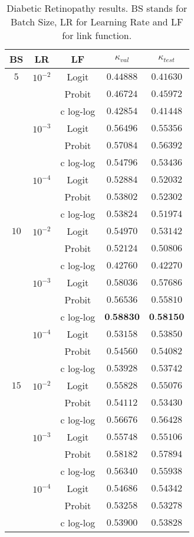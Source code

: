 \documentclass[journal]{IEEEtran}
\begin{document}
	\begin{table}[!t]
		\caption{Diabetic Retinopathy results. BS stands for Batch Size, LR for Learning Rate and LF for link function.}
		\label{table:DRresults}
		\footnotesize
		\centering
		\begin{tabular}{ccc|cc}
			BS & LR & LF & $\kappa_{val}$ & $\kappa_{test}$\\\hline
			$5$ & $10^{-2}$ & Logit & $0.44888$ & $0.41630$\\
			& & Probit & $0.46724$ & $0.45972$\\
			& & c log-log & $0.42854$ & $0.41448$\\
			& $10^{-3}$ & Logit & $0.56496$ & $0.55356$\\
			& & Probit & $0.57084$ & $0.56392$\\
			& & c log-log & $0.54796$ & $0.53436$\\
			& $10^{-4}$ & Logit & $0.52884$ & $0.52032$\\
			& & Probit & $0.53802$ & $0.52302$\\
			& & c log-log & $0.53824$ & $0.51974$\\
			$10$ & $10^{-2}$ & Logit & $0.54970$ & $0.53142$\\
			& & Probit & $0.52124$ & $0.50806$\\
			& & c log-log & $0.42760$ & $0.42270$\\
			& $10^{-3}$ & Logit & $0.58036$ & $0.57686$\\
			& & Probit & $0.56536$ & $0.55810$\\
			& & c log-log & $\textbf{0.58830}$ & $\textbf{0.58150}$\\
			& $10^{-4}$ & Logit & $0.53158$ & $0.53850$\\
			& & Probit & $0.54560$ & $0.54082$\\
			& & c log-log & $0.53928$ & $0.53742$\\
			$15$ & $10^{-2}$ & Logit & $0.55828$ & $0.55076$\\
			& & Probit & $0.54112$ & $0.53430$\\
			& & c log-log & $0.56676$ & $0.56428$\\
			& $10^{-3}$ & Logit & $0.55748$ & $0.55106$\\
			& & Probit & $0.58182$ & $0.57894$\\
			& & c log-log & $0.56340$ & $0.55938$\\
			& $10^{-4}$ & Logit & $0.54686$ & $0.54342$\\
			& & Probit & $0.53258$ & $0.53278$\\
			& & c log-log & $0.53900$ & $0.53828$
		\end{tabular}
	\end{table}
	
\end{document}
